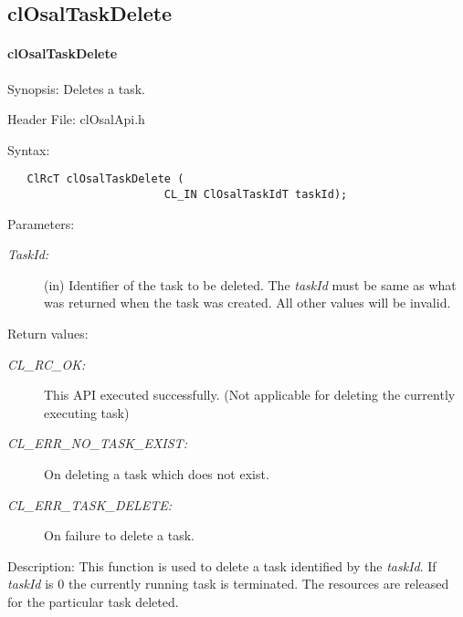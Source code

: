 \subsection{clOsalTaskDelete}
\hypertarget{pageosal104}{}\paragraph{cl\-Osal\-Task\-Delete}\label{pageosal104}
\begin{Desc}
\item[Synopsis:]Deletes a task.\end{Desc}
\begin{Desc}
\item[Header File:]clOsalApi.h\end{Desc}
\begin{Desc}
\item[Syntax:]

\footnotesize\begin{verbatim}   ClRcT clOsalTaskDelete (
                        CL_IN ClOsalTaskIdT taskId);
\end{verbatim}
\normalsize
\end{Desc}
\begin{Desc}
\item[Parameters:]
\begin{description}
\item[{\em Task\-Id:}](in) Identifier of the task to be deleted. The {\em task\-Id\/} must be same as what was returned when the task was created. All other values will be invalid.\end{description}
\end{Desc}
\begin{Desc}
\item[Return values:]
\begin{description}
\item[{\em CL\_\-RC\_\-OK:}]This API executed successfully. (Not applicable for deleting the currently executing task) \item[{\em CL\_\-ERR\_\-NO\_\-TASK\_\-EXIST:}]On deleting a task which does not exist. \item[{\em CL\_\-ERR\_\-TASK\_\-DELETE:}]On failure to delete a task.\end{description}
\end{Desc}
\begin{Desc}
\item[Description:]This function is used to delete a task identified by the {\em task\-Id\/}. If {\em task\-Id\/} is 0 the currently running task is terminated. The resources are released for the particular task deleted.\end{Desc}
